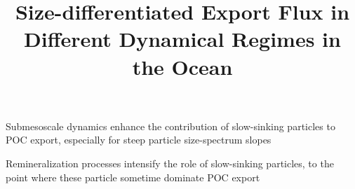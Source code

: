 \documentclass[article,linenumbers]{agujournal2019}
\begin{document}
	\title{Size-differentiated Export Flux in Different Dynamical Regimes in the Ocean}



	\begin{keypoints}
		\item Submesoscale dynamics enhance the contribution of slow-sinking particles to POC export, especially for steep particle size-spectrum slopes
		\item Remineralization processes intensify the role of slow-sinking particles, to the point where these particle sometime dominate POC export
	\end{keypoints}
\end{document}
